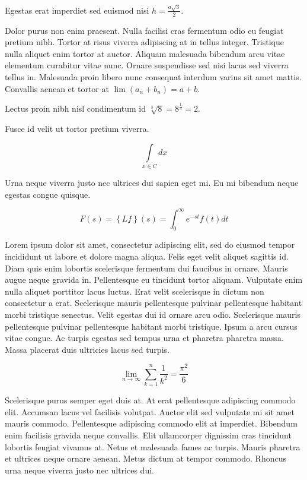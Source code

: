 \documentclass{article}
\begin{document}
	
    Egestas erat imperdiet sed euismod nisi 
    \begin{math}
    h=\frac{a\sqrt{3}}{2}
    \end{math}.
    \newline
    
    Dolor purus non enim praesent. Nulla facilisi cras fermentum odio eu feugiat pretium nibh. Tortor at risus viverra adipiscing at in tellus integer. Tristique nulla aliquet enim tortor at auctor. Aliquam malesuada bibendum arcu vitae elementum curabitur vitae nunc. Ornare suspendisse sed nisi lacus sed viverra tellus in. Malesuada proin libero nunc consequat interdum varius sit amet mattis. Convallis aenean et tortor at $ \lim\left ( a_n+b_n \right )=a+b $.
    \newline
    
    Lectus proin nibh nisl condimentum id \( \sqrt[3]{8}=8^{\frac{1}{3}}=2 \).
    \newline
    
    Fusce id velit ut tortor pretium viverra.
    
    \[ \int\limits_{x\in C}dx  \]
    
    Urna neque viverra justo nec ultrices dui sapien eget mi. Eu mi bibendum neque egestas congue quisque.
    
    $$ F\left ( s \right )=\left \{ Lf \right \}\left ( s \right )= \int_{0}^{\infty } e^{-st}f\left ( t \right ) dt $$
    
    Lorem ipsum dolor sit amet, consectetur adipiscing elit, sed do eiusmod tempor incididunt ut labore et dolore magna aliqua. Felis eget velit aliquet sagittis id. Diam quis enim lobortis scelerisque fermentum dui faucibus in ornare. Mauris augue neque gravida in. Pellentesque eu tincidunt tortor aliquam. Vulputate enim nulla aliquet porttitor lacus luctus. Erat velit scelerisque in dictum non consectetur a erat. Scelerisque mauris pellentesque pulvinar pellentesque habitant morbi tristique senectus. Velit egestas dui id ornare arcu odio. Scelerisque mauris pellentesque pulvinar pellentesque habitant morbi tristique. Ipsum a arcu cursus vitae congue. Ac turpis egestas sed tempus urna et pharetra pharetra massa. Massa placerat duis ultricies lacus sed turpis.
    
    \begin{displaymath}
    	\lim_{n \to \infty}\sum_{k=1}^n \frac{1}{k^2}= \frac{\pi^2}{6}
    \end{displaymath}
    
   Scelerisque purus semper eget duis at. At erat pellentesque adipiscing commodo elit. Accumsan lacus vel facilisis volutpat. Auctor elit sed vulputate mi sit amet mauris commodo. Pellentesque adipiscing commodo elit at imperdiet. Bibendum enim facilisis gravida neque convallis. Elit ullamcorper dignissim cras tincidunt lobortis feugiat vivamus at. Netus et malesuada fames ac turpis. Mauris pharetra et ultrices neque ornare aenean. Metus dictum at tempor commodo. Rhoncus urna neque viverra justo nec ultrices dui.
    
\end{document}
